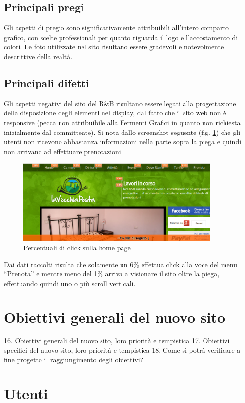 \documentclass[a4paper,12pt,hidelinks]{report}
\begin{document}
\subsection{Principali pregi}
Gli aspetti di pregio sono significativamente attribuibili all'intero comparto grafico, con scelte professionali per quanto riguarda il logo e l'accostamento di colori. Le foto utilizzate nel sito risultano essere gradevoli e
notevolmente descrittive della realtà.
\subsection{Principali difetti}
Gli aspetti negativi del sito del B\&B risultano essere legati alla progettazione della disposizione degli elementi nel display, dal fatto che il sito web non è responsive (pecca non attribuibile alla Fermenti Grafici in quanto
non richiesta inizialmente dal committente). 
Si nota dallo screenshot seguente (fig. \ref{fig:analytics2}) che gli utenti non ricevono abbastanza informazioni nella parte sopra la piega e quindi non arrivano ad effettuare prenotazioni.
\begin{figure}[h!]
  \includegraphics[width=0.9\textwidth,keepaspectratio=true]{img/googleAnalytics2}
   \centering
   \caption{Percentuali di click sulla home page}%
   \label{fig:analytics2}%
\end{figure}
Dai dati raccolti risulta che solamente un 6\% effettua click alla voce del menu ``Prenota'' e mentre meno del 1\% arriva a visionare il sito oltre la piega, effettuando quindi uno o più scroll verticali.


\section{Obiettivi generali del nuovo sito}
16. Obiettivi generali del nuovo sito, loro priorità e tempistica
17. Obiettivi specifici del nuovo sito, loro priorità e tempistica
18. Come si potrà verificare a fine progetto il raggiungimento degli obiettivi?
\section{Utenti}
\end{document}
